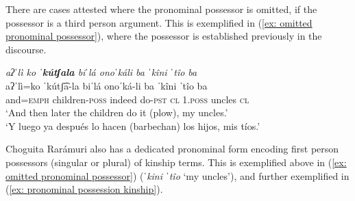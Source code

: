 \ea\label{ex: full and reduced pronominal possessors}

    \z
\z

There are cases attested where the pronominal possessor is omitted, if the possessor is a third person argument. This is exemplified in (\ref{ex: omitted pronominal possessor}), where the possessor is established previously in the discourse.

\ea\label{ex: omitted pronominal possessor}

\textit{aʔˈlì ko \textbf{ˈkútʃala} biˈlá onoˈkáli ba ˈkîni ˈtîo ba}\\
\gll    aʔˈlì=ko ˈkútʃ͡a-la biˈlá onoˈká-li ba ˈkîni ˈtîo ba\\
        and\textsc{=emph} children-\textsc{poss} indeed do-\textsc{pst} \textsc{cl} \textsc{1.poss} uncles \textsc{cl}\\
\glt    `And then later the children do it (plow), my uncles.'\\
\glt    `Y luego ya después lo hacen (barbechan) los hijos, mis tíos.’    \\

\z

Choguita Rarámuri also has a dedicated pronominal form encoding first person possessors (singular or plural) of kinship terms. This is exemplified above in (\ref{ex: omitted pronominal possessor}) (\textit{ˈkini ˈtîo} `my uncles'), and further exemplified in (\ref{ex: pronominal possession kinship}).


\ea\label{ex: pronominal possession kinship}

